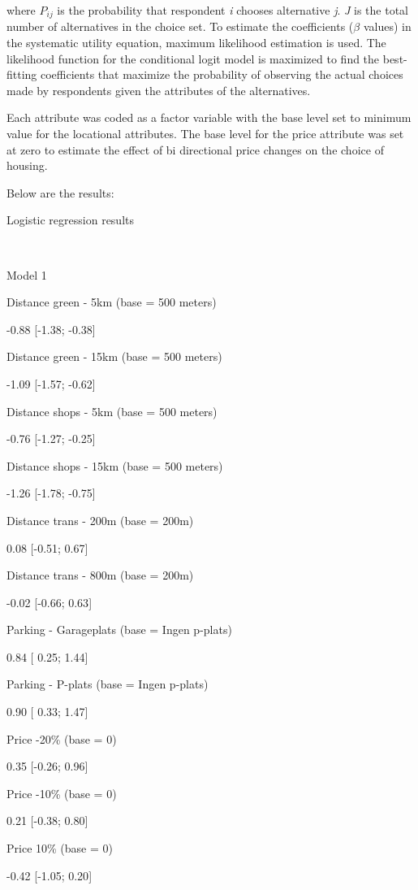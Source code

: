 \documentclass[
]{article}
\begin{document}
\noindent where \(P_{ij}\) is the probability that respondent \textit{i}
chooses alternative \textit{j}. \textit{J} is the total number of
alternatives in the choice set. To estimate the coefficients (\(\beta\)
values) in the systematic utility equation, maximum likelihood
estimation is used. The likelihood function for the conditional logit
model is maximized to find the best-fitting coefficients that maximize
the probability of observing the actual choices made by respondents
given the attributes of the alternatives.

Each attribute was coded as a factor variable with the base level set to
minimum value for the locational attributes. The base level for the
price attribute was set at zero to estimate the effect of bi directional
price changes on the choice of housing.

Below are the results:

Logistic regression results

~

Model 1

Distance green - 5km (base = 500 meters)

-0.88 {[}-1.38; -0.38{]}

Distance green - 15km (base = 500 meters)

-1.09 {[}-1.57; -0.62{]}

Distance shops - 5km (base = 500 meters)

-0.76 {[}-1.27; -0.25{]}

Distance shops - 15km (base = 500 meters)

-1.26 {[}-1.78; -0.75{]}

Distance trans - 200m (base = 200m)

0.08 {[}-0.51; 0.67{]}

Distance trans - 800m (base = 200m)

-0.02 {[}-0.66; 0.63{]}

Parking - Garageplats (base = Ingen p-plats)

0.84 {[} 0.25; 1.44{]}

Parking - P-plats (base = Ingen p-plats)

0.90 {[} 0.33; 1.47{]}

Price -20\% (base = 0)

0.35 {[}-0.26; 0.96{]}

Price -10\% (base = 0)

0.21 {[}-0.38; 0.80{]}

Price 10\% (base = 0)

-0.42 {[}-1.05; 0.20{]}
\end{document}
